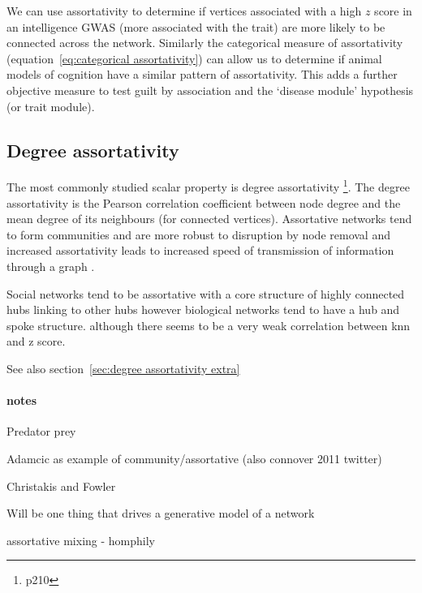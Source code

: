We can use assortativity to determine if vertices associated with a high $z$ score in an intelligence GWAS (more associated with the trait) are more likely to be connected across the network. Similarly the categorical measure of assortativity (equation~\ref{eq:categorical assortativity}) can allow us to determine if animal models of cognition have a similar pattern of assortativity. This adds a further objective measure to test guilt by association and the `disease module'\cite{baranzini2013network} hypothesis (or trait module).

\subsection{Degree assortativity}
\label{sec:degree assortativity}

The most commonly studied scalar property is degree assortativity \cite{newman2018networks}\footnote{p210}. The degree assortativity is the Pearson correlation coefficient between node degree and the mean degree of its neighbours (for connected vertices)\cite{noldus2015assortativity}. Assortative networks tend to form communities and are more robust to disruption by node removal \cite{newman2002assortative} and increased assortativity leads to increased speed of transmission of information through a graph \cite{noldus2015assortativity}.

Social networks tend to be assortative with a core structure of highly connected hubs linking to other hubs\cite{newman2018networks} however biological networks tend to have a hub and spoke structure.  
 although there seems to be a very weak correlation between knn and z score. 


See also section~\ref{sec:degree assortativity extra}

\paragraph{notes}

Predator prey

Adamcic as example of community/assortative (also connover 2011 twitter)

Christakis and Fowler


Will be one thing that drives a generative model of a network

assortative mixing - homphily   

